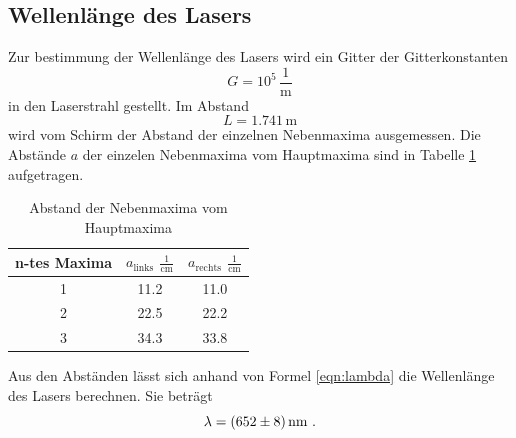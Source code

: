 \subsection{Wellenlänge des Lasers}
Zur bestimmung der Wellenlänge des Lasers wird ein Gitter der Gitterkonstanten 
\begin{equation}
  G = 10^5 \, \frac{1}{\text{m}}
  \label{eqn:constg}
\end{equation}
in den Laserstrahl gestellt. Im Abstand 
\begin{equation}
  L = 1.741 \, \text{m}
  \label{eqn:K}
\end{equation}
wird vom Schirm der Abstand der einzelnen Nebenmaxima ausgemessen. Die Abstände $a$ der einzelen Nebenmaxima vom Hauptmaxima sind in Tabelle \ref{tab:max} aufgetragen.
\begin{table}
  \centering
  \begin{tabular}{c c c}
    \toprule
    n-tes Maxima & $a_\text{links}$ $\frac{1}{\text{cm}}$ & $a_\text{rechts}$ $\frac{1}{\text{cm}}$ \\
    \midrule
	1 & 11.2 & 11.0 \\
	2 & 22.5 & 22.2 \\
	3 & 34.3 & 33.8 \\
    \bottomrule
  \end{tabular}
  \caption{Abstand der Nebenmaxima vom Hauptmaxima}
  \label{tab:max}
\end{table}
Aus den Abständen lässt sich anhand von Formel \ref{eqn:lambda} die Wellenlänge des Lasers berechnen. Sie beträgt 
\begin{equation}
  \lambda = (\num{652 +- 8}) \, \text{nm} \ .
\end{equation}
